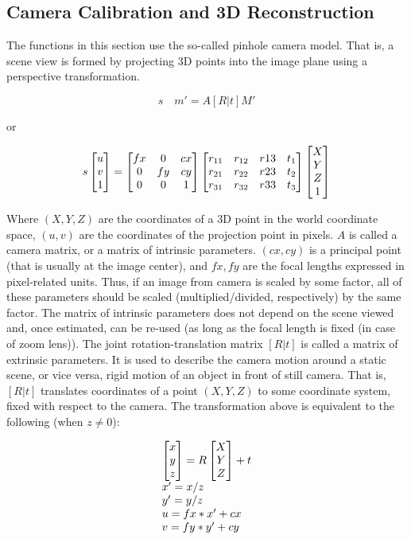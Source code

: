 \begin{description}
\subsection{Camera Calibration and 3D Reconstruction}

The functions in this section use the so-called pinhole camera model. That
is, a scene view is formed by projecting 3D points into the image plane
using a perspective transformation.

\[
s \quad m' = A [R|t] M'
\]

or

\[
s \begin{bmatrix} u\\ v\\ 1 \end{bmatrix} = \begin{bmatrix} fx & 0 & cx\\ 0 & fy & cy\\ 0 & 0 & 1 \end{bmatrix}
\begin{bmatrix}
 r_{11} & r_{12} & r{13} & t_1 \\
 r_{21} & r_{22} & r{23} & t_2 \\
 r_{31} & r_{32} & r{33} & t_3
\end{bmatrix}
\begin{bmatrix}X\\Y\\Z\\1 \end{bmatrix}
\]

Where $(X, Y, Z)$ are the coordinates of a 3D point in the world
coordinate space, $(u, v)$ are the coordinates of the projection point
in pixels. $A$ is called a camera matrix, or a matrix of
intrinsic parameters. $(cx, cy)$ is a principal point (that is
usually at the image center), and $fx, fy$ are the focal lengths
expressed in pixel-related units. Thus, if an image from camera is
scaled by some factor, all of these parameters should
be scaled (multiplied/divided, respectively) by the same factor. The
matrix of intrinsic parameters does not depend on the scene viewed and,
once estimated, can be re-used (as long as the focal length is fixed (in
case of zoom lens)). The joint rotation-translation matrix $[R|t]$
is called a matrix of extrinsic parameters. It is used to describe the
camera motion around a static scene, or vice versa, rigid motion of an
object in front of still camera. That is, $[R|t]$ translates
coordinates of a point $(X, Y, Z)$ to some coordinate system,
fixed with respect to the camera. The transformation above is equivalent
to the following (when $z \ne 0$):

\[
\begin{array}{l}
\begin{bmatrix} x\\ y\\ z \end{bmatrix} = R \begin{bmatrix} X\\ Y\\ Z \end{bmatrix} + t\\
x' = x/z\\
y' = y/z\\
u = fx*x' + cx\\
v = fy*y' + cy
\end{array}
\]


\end{description}
